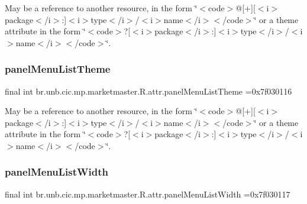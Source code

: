 May be a reference to another resource, in the form \char`\"{}$<$code$>$@\mbox{[}+\mbox{]}\mbox{[}$<$i$>$package$<$/i$>$\+:\mbox{]}$<$i$>$type$<$/i$>$/$<$i$>$name$<$/i$>$$<$/code$>$\char`\"{} or a theme attribute in the form \char`\"{}$<$code$>$?\mbox{[}$<$i$>$package$<$/i$>$\+:\mbox{]}$<$i$>$type$<$/i$>$/$<$i$>$name$<$/i$>$$<$/code$>$\char`\"{}. \mbox{\label{classbr_1_1unb_1_1cic_1_1mp_1_1marketmaster_1_1R_1_1attr_a5e2647d94dd4b70074442e9590473f70}} 
\subsubsection{\texorpdfstring{panel\+Menu\+List\+Theme}{panelMenuListTheme}}
{\footnotesize\ttfamily final int br.\+unb.\+cic.\+mp.\+marketmaster.\+R.\+attr.\+panel\+Menu\+List\+Theme =0x7f030116\hspace{0.3cm}{\ttfamily [static]}}

May be a reference to another resource, in the form \char`\"{}$<$code$>$@\mbox{[}+\mbox{]}\mbox{[}$<$i$>$package$<$/i$>$\+:\mbox{]}$<$i$>$type$<$/i$>$/$<$i$>$name$<$/i$>$$<$/code$>$\char`\"{} or a theme attribute in the form \char`\"{}$<$code$>$?\mbox{[}$<$i$>$package$<$/i$>$\+:\mbox{]}$<$i$>$type$<$/i$>$/$<$i$>$name$<$/i$>$$<$/code$>$\char`\"{}. \mbox{\label{classbr_1_1unb_1_1cic_1_1mp_1_1marketmaster_1_1R_1_1attr_a51453ffd50027501d741b22b41a5fcd7}} 
\subsubsection{\texorpdfstring{panel\+Menu\+List\+Width}{panelMenuListWidth}}
{\footnotesize\ttfamily final int br.\+unb.\+cic.\+mp.\+marketmaster.\+R.\+attr.\+panel\+Menu\+List\+Width =0x7f030117\hspace{0.3cm}{\ttfamily [static]}}

